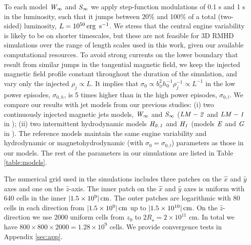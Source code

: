 \documentclass[fleqn,usenatbib]{mnras}
\newcommand{\cm}{\,{\rm cm}}
\newcommand{\s}{\,{\rm s}}
\newcommand{\erg}{\,{\rm erg}}
\newcommand{\Ha}{{\it H_{0.1}}}
\newcommand{\Hb}{{\it H_{1}}}
\newcommand{\Wc}{{\it W_{\infty}}}
\newcommand{\Sc}{{\it S_{\infty}}}
\newcommand{\sigl}{{\sigma_{0,l}}}
\newcommand{\sigh}{{\sigma_{0,h}}}
\begin{document}
	To each model $ \Wc $ and $ \Sc $ we apply step-function modulations of 0.1 s and 1 s in the luminosity, such that it jumps between 20\% and 100\% of a total (two-sided) luminosity, $ L = 10^{50} \erg~\s^{-1} $.
	We stress that the central engine variability is likely to be on shorter timescales, but these are not feasible for 3D RMHD simulations over the range of length scales used in this work, given our available computational resources.
	To avoid strong currents on the lower boundary that result from similar jumps in the tangential magnetic field, we keep the injected magnetic field profile constant throughout the duration of the simulation, and vary only the injected $ \rho_j \propto L $. It implies that $\sigma_0\propto b_\phi^2 h_0^{-1} \rho_j^{-1} \propto L^{-1}$ in the low power episodes, $ \sigh $, is 5 times higher than in the high power episodes, $ \sigl $.
	We compare our results with jet models from our previous studies: (i) two continuously injected magnetic jets models, $ \Wc $ and $\Sc $ ($ {\it LM-2} $ and $ {\it LM-1} $ in \citealt{Gottlieb2020b}); (ii) two intermittent hydrodynamic models $ \Ha $ and $ \Hb $ (models $ {\it E} $ and $ {\it G} $ in \citealt{Gottlieb2020a}). The reference models maintain the same engine variability and hydrodynamic or magnetohydrodynamic (with $ \sigma_0 = \sigl $) parameters as those in our models.
	The rest of the parameters in our simulations are listed in Table \ref{table:models}.
	
	The numerical grid used in the simulations includes three patches on the $ \hat{x} $ and $ \hat{y} $ axes and one on the $ \hat{z} $-axis.
	The inner patch on the $ \hat{x} $ and $ \hat{y} $ axes is uniform with 640 cells in the inner $ |1.5\times 10^9|\cm $. The outer patches are logarithmic with 80 cells in each direction from $ |1.5\times 10^9|\cm $ up to $ |1.5\times 10^{10}|\cm $. On the $ \hat{z} $-direction we use 2000 uniform cells from $ z_{0} $ to $ 2R_\star=2\times10^{11} $ cm. In total we have $ 800\times 800\times 2000 = 1.28\times 10^9 $ cells. We provide convergence tests in Appendix \ref{sec:app}.
	
\end{document}
